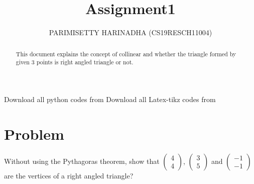 \documentclass[journal,12pt,twocolumn]{IEEEtran}
\title{ Assignment1}
\author{PARIMISETTY HARINADHA (CS19RESCH11004)}
\newcommand{\myvec}[1]{\ensuremath{\begin{pmatrix}#1\end{pmatrix}}}
\begin{document}
\maketitle
\newpage
\begin{abstract}
This document explains the concept of collinear and whether the triangle formed by given 3 points is right angled triangle or not.
\end{abstract}
Download all python codes from 
Download all Latex-tikz codes from 
\section{Problem}
Without using the Pythagoras theorem, show that \myvec{ 4 \\ 4 }, \myvec{ 3 \\ 5 } and \myvec{ -1 \\ -1 } are the vertices of a right angled triangle?
\end{document}
